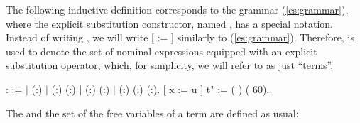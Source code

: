 The following inductive definition corresponds to the grammar (\ref{es:grammar}), where the explicit substitution constructor, named , has a special notation. Instead of writing    , we will write [ := ]  similarly to (\ref{es:grammar}). Therefore,  is used to denote the set of nominal expressions equipped with an explicit substitution operator, which, for simplicity, we will refer to as just ``terms''. 
\begin{coqdoccode}
\coqdocemptyline
\coqdocnoindent
{}  :  :=\coqdoceol
\coqdocindent{0.50em}
\ensuremath{|}  (:)\coqdoceol
\coqdocindent{0.50em}
\ensuremath{|}  (:) (:)\coqdoceol
\coqdocindent{0.50em}
\ensuremath{|}  (:) (:)\coqdoceol
\coqdocindent{0.50em}
\ensuremath{|}  (:) (:) (:).\coqdoceol
\coqdocnoindent
{} [ x := u ] t" := (   ) (  60).\coqdoceol
\coqdocemptyline
\end{coqdoccode}
The  and the set  of the free variables of a term are defined as usual: 
